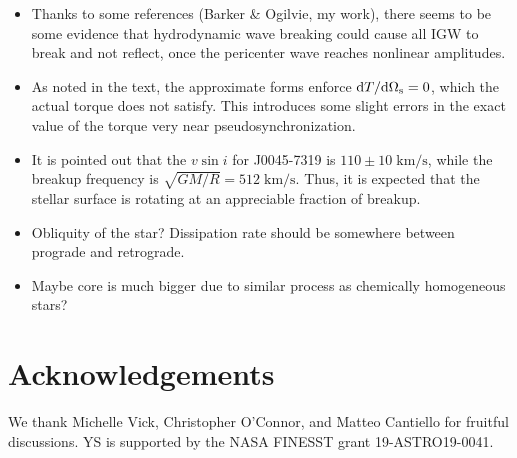 \documentclass[
        fleqn,
        usenatbib,
    ]{mnras}
\newcommand*{\rdil}[2]{\mathrm{d}#1 / \mathrm{d}#2}
\begin{document}
\begin{itemize}
    \item Thanks to some references (Barker \& Ogilvie, my work), there seems to
        be some evidence that hydrodynamic wave breaking could cause all IGW to
        break and not reflect, once the pericenter wave reaches nonlinear
        amplitudes.

    \item As noted in the text, the approximate forms enforce
        $\rdil{T}{\Omega_{\rm s}} = 0$, which the actual torque does not satisfy.
        This introduces some slight errors in the exact value of the torque very
        near pseudosynchronization.

    \item It is pointed out that the $v \sin i$ for J0045-7319 is $110 \pm 10
        \;\mathrm{km/s}$, while the breakup frequency is $\sqrt{GM / R} =
        512\;\mathrm{km/s}$. Thus, it is expected that the stellar surface is
        rotating at an appreciable fraction of breakup.

    \item Obliquity of the star? Dissipation rate should be somewhere between
        prograde and retrograde.

    \item Maybe core is much bigger due to similar process as chemically
        homogeneous stars?
\end{itemize}

\section{Acknowledgements}

We thank Michelle Vick, Christopher O'Connor, and Matteo Cantiello for fruitful
discussions. YS is supported by the NASA FINESST grant 19-ASTRO19-0041.





\bsp
\label{lastpage} %
\end{document}
